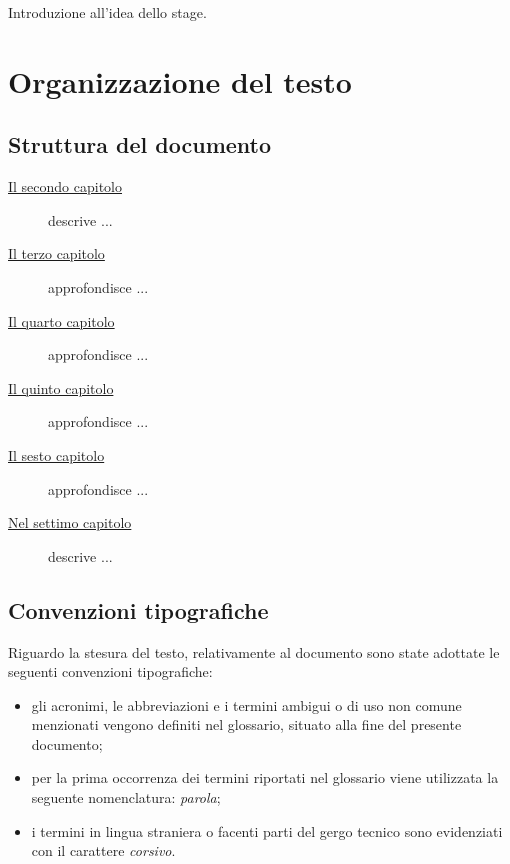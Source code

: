 Introduzione all'idea dello stage.

\section{Organizzazione del testo}

\subsection{Struttura del documento}
\label{sec:organizzazione-testo}

\begin{description}
    \item[{\hyperref[cap:processi-metodologie]{Il secondo capitolo}}] descrive ...
    
    \item[{\hyperref[cap:descrizione-stage]{Il terzo capitolo}}] approfondisce ...
    
    \item[{\hyperref[cap:analisi-requisiti]{Il quarto capitolo}}] approfondisce ...
    
    \item[{\hyperref[cap:progettazione-codifica]{Il quinto capitolo}}] approfondisce ...
    
    \item[{\hyperref[cap:verifica-validazione]{Il sesto capitolo}}] approfondisce ...
    
    \item[{\hyperref[cap:conclusioni]{Nel settimo capitolo}}] descrive ...
\end{description}

\subsection{Convenzioni tipografiche}
\label{sec:convenzioni-tipografiche}

Riguardo la stesura del testo, relativamente al documento sono state adottate le seguenti convenzioni tipografiche:
\begin{itemize}
	\item gli acronimi, le abbreviazioni e i termini ambigui o di uso non comune menzionati vengono definiti nel glossario, situato alla fine del presente documento;
	\item per la prima occorrenza dei termini riportati nel glossario viene utilizzata la seguente nomenclatura: \emph{parola}\glsfirstoccur;
	\item i termini in lingua straniera o facenti parti del gergo tecnico sono evidenziati con il carattere \emph{corsivo}.
\end{itemize}
